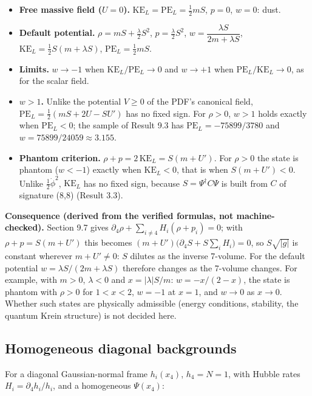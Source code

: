 \documentclass[11pt]{article}
\begin{document}
\begin{itemize}
\item \textbf{Free massive field ($U=0$).} $\mathrm{KE}_L=\mathrm{PE}_L=\tfrac12mS$, $p=0$, $w=0$: dust.
\item \textbf{Default potential.} $\rho=mS+\tfrac\lambda2S^2$, $p=\tfrac\lambda2S^2$, $w=\dfrac{\lambda S}{2m+\lambda S}$, $\mathrm{KE}_L=\tfrac12S(m+\lambda S)$, $\mathrm{PE}_L=\tfrac12mS$.
\item \textbf{Limits.} $w\to-1$ when $\mathrm{KE}_L/\mathrm{PE}_L\to0$ and $w\to+1$ when $\mathrm{PE}_L/\mathrm{KE}_L\to0$, as for the scalar field.
\item \textbf{$w>1$.} Unlike the potential $V\ge0$ of the PDF's canonical field, $\mathrm{PE}_L=\tfrac12(mS+2U-SU')$ has no fixed sign. For $\rho>0$, $w>1$ holds exactly when $\mathrm{PE}_L<0$; the sample of Result 9.3 has $\mathrm{PE}_L=-75899/3780$ and $w=75899/24059\approx3.155$.
\item \textbf{Phantom criterion.} $\rho+p=2\,\mathrm{KE}_L=S(m+U')$. For $\rho>0$ the state is phantom ($w<-1$) exactly when $\mathrm{KE}_L<0$, that is when $S(m+U')<0$. Unlike $\tfrac12\dot\phi^2$, $\mathrm{KE}_L$ has no fixed sign, because $S=\Psi^\dagger C\Psi$ is built from $C$ of signature (8,8) (Result 3.3).
\end{itemize}

\textbf{Consequence (derived from the verified formulas, not machine-checked).} Section 9.7 gives $\partial_4\rho+\sum_{i\ne4}H_i(\rho+p_i)=0$; with $\rho+p=S(m+U')$ this becomes $(m+U')\bigl(\partial_4S+S\sum_iH_i\bigr)=0$, so $S\sqrt{|g|}$ is constant wherever $m+U'\ne0$: $S$ dilutes as the inverse 7-volume. For the default potential $w=\lambda S/(2m+\lambda S)$ therefore changes as the 7-volume changes. For example, with $m>0$, $\lambda<0$ and $x=|\lambda|S/m$: $w=-x/(2-x)$, the state is phantom with $\rho>0$ for $1<x<2$, $w=-1$ at $x=1$, and $w\to0$ as $x\to0$. Whether such states are physically admissible (energy conditions, stability, the quantum Krein structure) is not decided here.

\subsection{Homogeneous diagonal backgrounds}

For a diagonal Gaussian-normal frame $h_i(x_4)$, $h_4=N=1$, with Hubble rates $H_i=\partial_4h_i/h_i$, and a homogeneous $\Psi(x_4)$:
\end{document}
